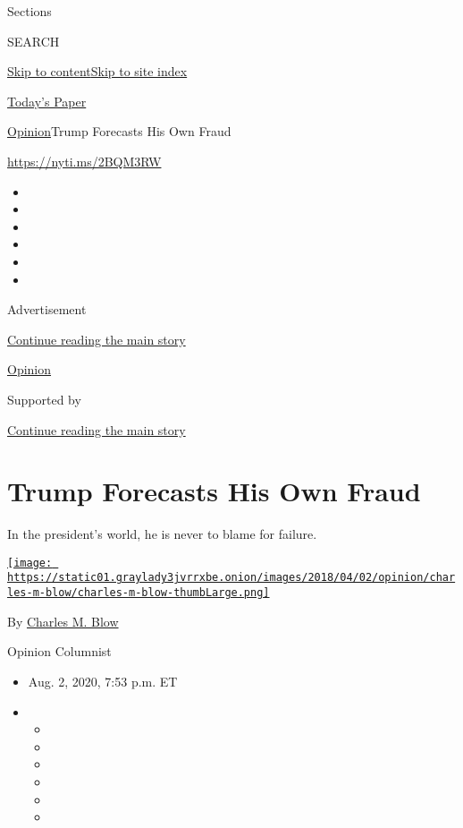 Sections

SEARCH

\protect\hyperlink{site-content}{Skip to
content}\protect\hyperlink{site-index}{Skip to site index}

\href{https://myaccount.nytimes3xbfgragh.onion/auth/login?response_type=cookie\&client_id=vi}{}

\href{https://www.nytimes3xbfgragh.onion/section/todayspaper}{Today's
Paper}

\href{/section/opinion}{Opinion}\textbar{}Trump Forecasts His Own Fraud

\url{https://nyti.ms/2BQM3RW}

\begin{itemize}
\item
\item
\item
\item
\item
\item
\end{itemize}

Advertisement

\protect\hyperlink{after-top}{Continue reading the main story}

\href{/section/opinion}{Opinion}

Supported by

\protect\hyperlink{after-sponsor}{Continue reading the main story}

\hypertarget{trump-forecasts-his-own-fraud}{%
\section{Trump Forecasts His Own
Fraud}\label{trump-forecasts-his-own-fraud}}

In the president's world, he is never to blame for failure.

\href{https://www.nytimes3xbfgragh.onion/by/charles-m-blow}{\texttt{[image: https://static01.graylady3jvrrxbe.onion/images/2018/04/02/opinion/charles-m-blow/charles-m-blow-thumbLarge.png]}}

By \href{https://www.nytimes3xbfgragh.onion/by/charles-m-blow}{Charles
M. Blow}

Opinion Columnist

\begin{itemize}
\item
  Aug. 2, 2020, 7:53 p.m. ET
\item
  \begin{itemize}
  \item
  \item
  \item
  \item
  \item
  \item
  \end{itemize}
\end{itemize}

